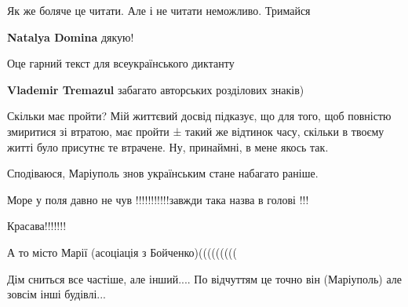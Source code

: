 Як же боляче це читати. Але і не читати неможливо. Тримайся

\begin{itemize} %
\textbf{Natalya Domina} дякую!
\end{itemize} %


Оце гарний текст для всеукраїнського диктанту

\begin{itemize} %
\textbf{Vlademir Tremazul} забагато авторських розділових знаків)
\end{itemize} %


Скільки має пройти? Мій життєвий досвід підказує, що для того, щоб повністю
змиритися зі втратою, має пройти ± такий же відтинок часу, скільки в твоєму
житті було присутнє те втрачене. Ну, принаймні, в мене якось так.

Сподіваюся, Маріуполь знов українським стане набагато раніше.


Море у поля давно не чув !!!!!!!!!!!завжди така назва в голові !!!

Красава!!!!!!!

А то місто Марії (асоціація з Бойченко)(((((((((


Дім сниться все частіше, але інший.... По відчуттям це точно він (Маріуполь)
але зовсім інші будівлі...

